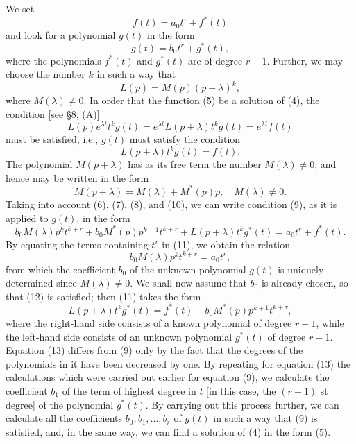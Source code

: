 \documentclass[10pt,a5paper]{book}
\makeatletter
\theoremstyle{plain}
\theoremstyle{definition}
\theoremstyle{remark}
\renewenvironment{proof}[1][\proofname]{\par
  \pushQED{\qed}%
  \normalfont\topsep6\p@\@plus6\p@\relax
  \trivlist
  \item\relax{\itshape #1\@addpunct{.}}\hspace\labelsep\ignorespaces
}{\popQED\endtrivlist\@endpefalse}
\makeatother
\begin{document}
\begin{proof}
We set
\begin{equation*}
f(t)=a_{0} t^{\tau}+f^{*}(t) \tag{6}
\end{equation*}
and look for a polynomial $g(t)$ in the form
\begin{equation*}
g(t)=b_{0} t^{r}+g^{*}(t), \tag{7}
\end{equation*}
where the polynomials $f^{*}(t)$ and $g^{*}(t)$ are of degree $r-1$. Further, we
may choose the number $k$ in such a way that
\begin{equation*}
L(p)=M(p)(p-\lambda)^{k}, \tag{8}
\end{equation*}
where $M(\lambda) \neq 0$. In order that the function (5) be a solution of (4), the condition [see §8, (A)]
\[
L(p) e^{\lambda t} t^{k} g(t)=e^{\lambda t} L(p+\lambda) t^{k} g(t)=e^{\lambda t} f(t)
\]
must be satisfied, i.e., $g(t)$ must satisfy the condition
\begin{equation*}
L(p+\lambda) t^{k} g(t)=f(t) . \tag{9}
\end{equation*}
The polynomial $M(p+\lambda)$ has as its free term the number $M(\lambda) \neq 0$, and hence may be written in the form
\begin{equation*}
M(p+\lambda)=M(\lambda)+M^{*}(p) p, \quad M(\lambda) \neq 0 . \tag{10}
\end{equation*}
Taking into account (6), (7), (8), and (10), we can write condition (9), as it is applied to $g(t)$, in the form
\begin{equation*}
b_{0} M(\lambda) p^{k} t^{k+r}+b_{0} M^{*}(p) p^{k+1} t^{k+r}+L(p+\lambda) t^{k} g^{*}(t)=a_{0} t^{r}+f^{*}(t) . \tag{11}
\end{equation*}
By equating the terms containing $t^{r}$ in (11), we obtain the relation
\begin{equation*}
b_{0} M(\lambda) p^{k} t^{k+r}=a_{0} t^{r}, \tag{12}
\end{equation*}
from which the coefficient $b_{0}$ of the unknown polynomial $g(t)$ is uniquely determined since $M(\lambda) \neq 0$. We shall now assume that $b_{0}$ is already chosen, so that (12) is satisfied; then (11) takes the form
\begin{equation*}
L(p+\lambda) t^{k} g^{*}(t)=f^{*}(t)-b_{0} M^{*}(p) p^{k+1} t^{k+\tau}, \tag{13}
\end{equation*}
where the right-hand side consists of a known polynomial of degree $r-1$, while the left-hand side consists of an unknown polynomial $g^{*}(t)$ of degree $r-1$. Equation (13) differs from (9) only by the fact that the degrees of the polynomials in it have been decreased by one. By repeating for equation (13) the calculations which were carried out earlier for equation (9), we calculate the coefficient $b_{1}$ of the term of highest degree in $t$ [in this case, the $(r-1)$ st degree] of the polynomial $g^{*}(t)$. By carrying out this process further, we can calculate all the coefficients $b_{0}, b_{1}, \ldots, b_{r}$ of $g(t)$ in such a way that (9) is satisfied, and, in the same way, we can find a solution of (4) in the form (5).


\end{proof}
\end{document}
